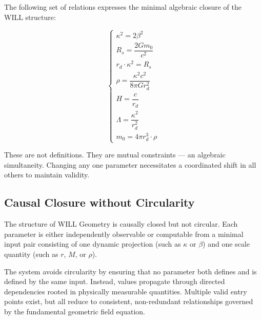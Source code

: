 \documentclass[12pt, a4paper]{article}
\begin{document}
The following set of relations expresses the minimal algebraic closure of the WILL structure:

\[
\begin{cases}
\kappa^2 = 2 \beta^2 \\
R_s = \dfrac{2G m_0}{c^2} \\
r_{d} \cdot \kappa^2 = R_s \\
\rho = \dfrac{\kappa^2 c^2}{8\pi Gr_{d}^2} \\
H = \dfrac{c}{r_{d}} \\
\Lambda = \dfrac{\kappa^2}{r_{d}^2} \\
m_0 = 4\pi r_{d}^3 \cdot \rho
\end{cases}
\]

These are not definitions.  
They are mutual constraints --- an algebraic simultaneity.  
Changing any one parameter necessitates a coordinated shift in all others to maintain validity.

\subsection*{Causal Closure without Circularity}

The structure of WILL Geometry is causally closed but not circular.  
Each parameter is either independently observable or computable from a minimal input pair  
consisting of one dynamic projection (such as $\kappa$ or $\beta$) and one scale quantity (such as $r$, $M$, or $\rho$).

The system avoids circularity by ensuring that no parameter both defines and is defined by the same input.  
Instead, values propagate through directed dependencies rooted in physically measurable quantities.  
Multiple valid entry points exist, but all reduce to consistent, non-redundant relationships  
governed by the fundamental geometric field equation.
\end{document}
